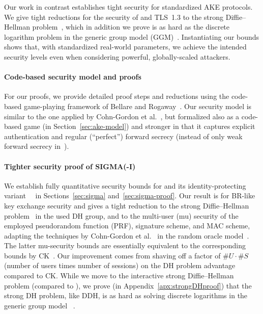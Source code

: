 \fi
Our work in contrast establishes tight security for standardized AKE protocols.
We give tight reductions for the security of \SIGMA and TLS~1.3 to the strong Diffie--Hellman problem~\cite{RSA:AbdBelRog01},
which in addition we prove is as hard as the discrete logarithm problem in the generic group model (GGM)~\cite{EC:Shoup97,IMA:Maurer05}.
Instantiating our bounds shows that, with standardized real-world parameters, we achieve the intended security levels even when considering powerful, globally-scaled attackers.


\iffull
\paragraph{Code-based security model and proofs}
For our proofs, we provide detailed proof steps and reductions using the code-based game-playing framework of Bellare and Rogaway~\cite{EC:BelRog06}.
Our security model is similar to the one applied by Cohn-Gordon et al.~\cite{C:CCGJJ19},
but formalized also as a code-based game (in Section~\ref{sec:ake-model}) and stronger in that it captures explicit authentication and regular (``perfect'') forward secrecy (instead of only weak forward secrecy in~\cite{C:CCGJJ19}).
\else

\fi


\paragraph{Tighter security proof of SIGMA(-I)}
We establish fully quantitative security bounds for \SIGMA and its identity-protecting variant~\SIGMAI~\cite{C:Krawczyk03} in Sections~\ref{sec:sigma} and~\ref{sec:sigma-proof}.
Our result is for BR-like~\cite{C:BelRog93} key exchange security and gives a tight reduction to the strong Diffie--Hellman problem~\cite{RSA:AbdBelRog01} in the used DH group, and to the multi-user (mu) security of the employed pseudorandom function (PRF), signature scheme, and MAC scheme, adapting the techniques by Cohn-Gordon et al.~\cite{C:CCGJJ19} in the random oracle model~\cite{CCS:BelRog93}.
The latter mu-security bounds are essentially equivalent to the corresponding bounds by CK~\cite{C:CanKra02}.
Our improvement comes from shaving off a factor of $\#U \cdot \#S$ (number of users times number of sessions) on the DH problem advantage compared to CK.
While we move to the interactive strong Diffie--Hellman problem (compared to ),
we prove (in Appendix~\ref{apx:strongDHproof}) that the strong DH problem, like DDH, is as hard as solving discrete logarithms in the generic group model~\cite{EC:Shoup97,IMA:Maurer05}%
.



